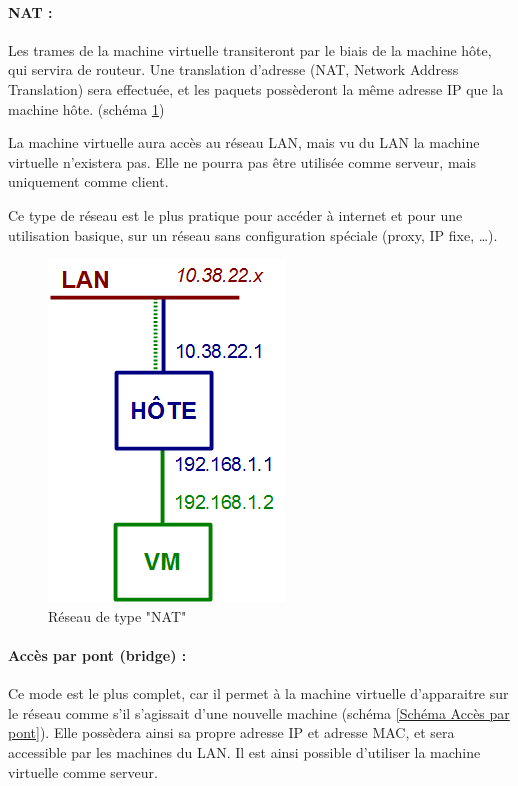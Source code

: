 \paragraph{NAT :}

Les trames de la machine virtuelle transiteront par le biais de la machine hôte, qui servira de routeur.
Une translation d'adresse (NAT, Network Address Translation) sera effectuée, et les paquets possèderont la même adresse IP que la machine hôte. (schéma \ref{Schéma NAT})

La machine virtuelle aura accès au réseau LAN, mais vu du LAN la machine virtuelle n'existera pas.
Elle ne pourra pas être utilisée comme serveur, mais uniquement comme client.

Ce type de réseau est le plus pratique pour accéder à internet et pour une utilisation basique, sur un réseau sans configuration spéciale (proxy, IP fixe, \ldots).

\begin{figure}[H]
	\center
	\includegraphics[scale=0.5]{img/types_reseau/NAT.png}
	\caption{Réseau de type "NAT"}
	\label{Schéma NAT}
\end{figure}


\paragraph{Accès par pont (bridge) :}

Ce mode est le plus complet, car il permet à la machine virtuelle d'apparaitre sur le réseau comme s'il s'agissait d'une nouvelle machine (schéma \ref{Schéma Accès par pont}).
Elle possèdera ainsi sa propre adresse IP et adresse MAC, et sera accessible par les machines du LAN.
Il est ainsi possible d'utiliser la machine virtuelle comme serveur.

